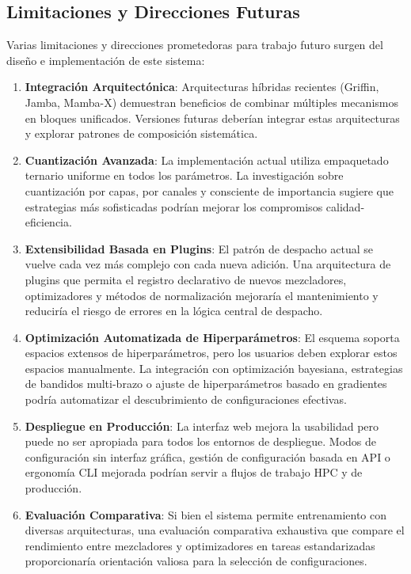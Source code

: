 \documentclass[11pt,a4paper]{article}
\begin{document}
\subsection{Limitaciones y Direcciones Futuras}

Varias limitaciones y direcciones prometedoras para trabajo futuro surgen del diseño e implementación de este sistema:

\begin{enumerate}[leftmargin=*]
    \item \textbf{Integración Arquitectónica}: Arquitecturas híbridas recientes (Griffin, Jamba, Mamba-X) demuestran beneficios de combinar múltiples mecanismos en bloques unificados. Versiones futuras deberían integrar estas arquitecturas y explorar patrones de composición sistemática.
    
    \item \textbf{Cuantización Avanzada}: La implementación actual utiliza empaquetado ternario uniforme en todos los parámetros. La investigación sobre cuantización por capas, por canales y consciente de importancia sugiere que estrategias más sofisticadas podrían mejorar los compromisos calidad-eficiencia.
    
    \item \textbf{Extensibilidad Basada en Plugins}: El patrón de despacho actual se vuelve cada vez más complejo con cada nueva adición. Una arquitectura de plugins que permita el registro declarativo de nuevos mezcladores, optimizadores y métodos de normalización mejoraría el mantenimiento y reduciría el riesgo de errores en la lógica central de despacho.
    
    \item \textbf{Optimización Automatizada de Hiperparámetros}: El esquema soporta espacios extensos de hiperparámetros, pero los usuarios deben explorar estos espacios manualmente. La integración con optimización bayesiana, estrategias de bandidos multi-brazo o ajuste de hiperparámetros basado en gradientes podría automatizar el descubrimiento de configuraciones efectivas.
    
    \item \textbf{Despliegue en Producción}: La interfaz web mejora la usabilidad pero puede no ser apropiada para todos los entornos de despliegue. Modos de configuración sin interfaz gráfica, gestión de configuración basada en API o ergonomía CLI mejorada podrían servir a flujos de trabajo HPC y de producción.
    
    \item \textbf{Evaluación Comparativa}: Si bien el sistema permite entrenamiento con diversas arquitecturas, una evaluación comparativa exhaustiva que compare el rendimiento entre mezcladores y optimizadores en tareas estandarizadas proporcionaría orientación valiosa para la selección de configuraciones.
    

\end{enumerate}
\end{document}

